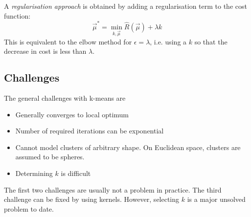 A \emph{regularisation approach} is obtained by adding
a regularisation term to the cost function:
\begin{equation*}
    \vec{\mu}^* = \min_{k, \vec{\mu}}{
        \hat{R}(\vec{\mu}) + \lambda k
    }
\end{equation*}
This is equivalent to the elbow method for
$\epsilon = \lambda$,
i.e. using a $k$ so that the decrease in cost is
less than $\lambda$.


\subsection{Challenges}
The general challenges with k-means are
\begin{itemize}
    \item Generally converges to local optimum
    \item Number of required iterations can be exponential
    \item Cannot model clusters of arbitrary shape.
    On Euclidean space, clusters are assumed to be spheres.
    \item Determining $k$ is difficult
\end{itemize}

The first two challenges are usually not a problem in practice.
The third challenge can be fixed by using kernels.
However, selecting $k$ is a major unsolved problem to date.
